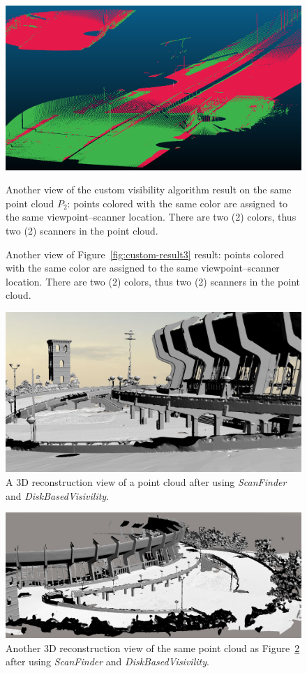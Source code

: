 \begin{figure}
  \centering
  \includegraphics[scale=0.35]{img/custom-result4.png}
  \caption{Another view of the custom visibility algorithm result on the same point cloud $P_2$: points colored with the same color are assigned to the same viewpoint--scanner location. There are two (2) colors, thus two (2) scanners in the point cloud.}
  \caption{Another view of Figure~\ref{fig:custom-result3} result: points colored with the same color are assigned to the same viewpoint--scanner location. There are two (2) colors, thus two (2) scanners in the point cloud.}
  \label{fig:custom-result4}
\end{figure}
\begin{figure}
  \centering
  \includegraphics[scale=0.35]{img/complete-result1.png}
  \caption{A 3D reconstruction view of a point cloud after using \emph{ScanFinder} and \emph{DiskBasedVisivility}.}
  \label{fig:complete-result1}
\end{figure}
\begin{figure}
  \centering
  \includegraphics[scale=0.35]{img/complete-result2.png}
    \caption{Another 3D reconstruction view of the same point cloud as Figure~\ref{fig:complete-result1} after using \emph{ScanFinder} and \emph{DiskBasedVisivility}.}
  \label{fig:complete-result2}
\end{figure}

